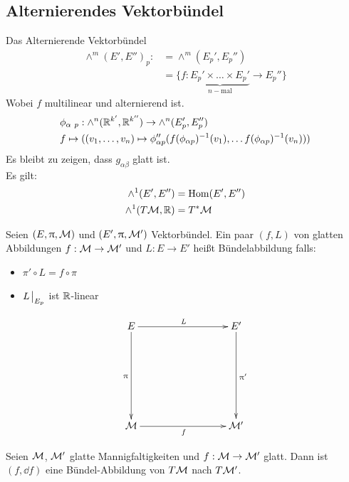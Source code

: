 \subsection{Alternierendes Vektorbündel}
Das Alternierende Vektorbündel
\begin{align}
\wedge^m(E', E'')_p :&= \wedge^m(E_{p}', E_{p}'')\\
&= \{ f: \underbrace{E_{p}' \times \dots \times E_{p}'}_{n-\mathrm{mal}} \to E_{p}'' \}
\end{align}
Wobei $f$ multilinear und alternierend ist. 
\begin{align}
&\phi_{\alpha \ p}: \wedge^n (\mathbb{R}^{k'}, \mathbb{R}^{k''}) \to \wedge^n (E_{p}', E_{p}'')\\
&f \mapsto ((v_1, \dots, v_n) \mapsto \phi_{\alpha p}''( f(\phi_{\alpha p})^{-1} (v_1), \dots f(\phi_{\alpha p})^{-1} (v_n)) )
\end{align}
Es bleibt zu zeigen, dass $g_{\alpha \beta}$ glatt ist.\\
Es gilt: 
\begin{align}
\wedge^1 (E', E'') &= \mathrm{Hom}(E', E'')\\
\wedge^1 (T\mathcal{M}, \mathbb{R}) &= T^{*}\mathcal{M}
\end{align}

\begin{defs}
Seien $(E, \uppi, \mathcal{M})$ und $(E', \uppi, \mathcal{M}')$ Vektorbündel.
Ein paar $(f, L)$ von glatten Abbildungen $f: \mathcal{M} \to \mathcal{M}'$ und $L: E \to E'$ heißt Bündelabbildung falls:
\begin{itemize}
\item $\pi' \circ L = f \circ \pi$
\item $L\eval_{E_p}$ ist $\mathbb{R}$-linear
\end{itemize}


\begin{align}
\begin{xy}
  \xymatrix@=0.25\linewidth{
      E \ar[r]^L \ar[d]_\pi    &   E' \ar[d]^{\pi '}  \\
      \mfk \ar[r]_f             &   \mfk'   
  }
\end{xy}
\end{align}
\end{defs}

\begin{bsp}
Seien $\mathcal{M}$, $\mathcal{M}'$ glatte Mannigfaltigkeiten und $f:\mathcal{M} \to \mathcal{M}'$ glatt.
Dann ist $(f, \dd f)$ eine Bündel-Abbildung von $T\mathcal{M}$ nach $T\mathcal{M}'$.
\end{bsp}


